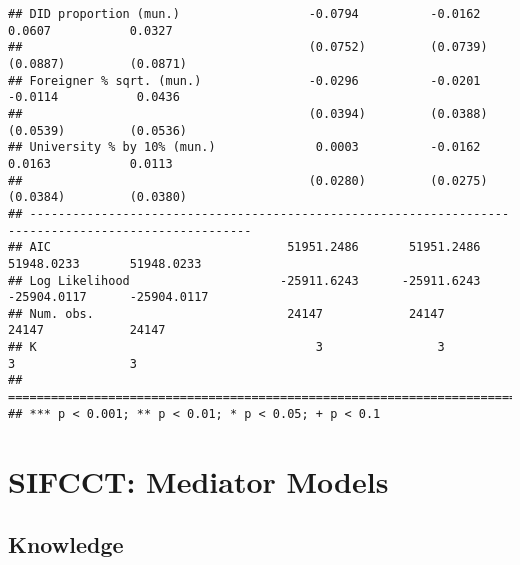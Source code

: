 \documentclass[
]{article}
\begin{document}
\begin{verbatim}
## DID proportion (mun.)                  -0.0794          -0.0162           0.0607           0.0327    
##                                        (0.0752)         (0.0739)         (0.0887)         (0.0871)   
## Foreigner % sqrt. (mun.)               -0.0296          -0.0201          -0.0114           0.0436    
##                                        (0.0394)         (0.0388)         (0.0539)         (0.0536)   
## University % by 10% (mun.)              0.0003          -0.0162           0.0163           0.0113    
##                                        (0.0280)         (0.0275)         (0.0384)         (0.0380)   
## -----------------------------------------------------------------------------------------------------
## AIC                                 51951.2486       51951.2486       51948.0233       51948.0233    
## Log Likelihood                     -25911.6243      -25911.6243      -25904.0117      -25904.0117    
## Num. obs.                           24147            24147            24147            24147         
## K                                       3                3                3                3         
## =====================================================================================================
## *** p < 0.001; ** p < 0.01; * p < 0.05; + p < 0.1
\end{verbatim}

\hypertarget{sifcct-mediator-models}{%
\section{SIFCCT: Mediator Models}\label{sifcct-mediator-models}}

\hypertarget{knowledge}{%
\subsection{Knowledge}\label{knowledge}}
\end{document}
